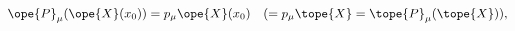 \begin{equation}	\label{12.119}
\ope{P}_{\mu} (\ope{X}(x_0)) = p_\mu \ope{X}(x_0)
\quad
( =p_\mu \tope{X} = \tope{P}_{\mu} (\tope{X}) ) ,
	\end{equation}

